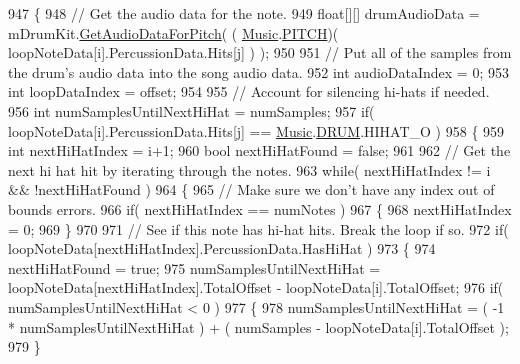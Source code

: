 \begin{DoxyCodeInclude}
947             \{
948                 \textcolor{comment}{// Get the audio data for the note.}
949                 \textcolor{keywordtype}{float}[][] drumAudioData = mDrumKit.\hyperlink{group___v_i_base_pub_func_gaf715f7c3bbd2f1a2fa543b2f0684f8a6}{GetAudioDataForPitch}( (
      \hyperlink{class_music}{Music}.\hyperlink{group___music_enums_ga508f69b199ea518f935486c990edac1d}{PITCH})( loopNoteData[i].PercussionData.Hits[j] ) );
950 
951                 \textcolor{comment}{// Put all of the samples from the drum's audio data into the song audio data.}
952                 \textcolor{keywordtype}{int} audioDataIndex = 0;
953                 \textcolor{keywordtype}{int} loopDataIndex = offset;
954 
955                 \textcolor{comment}{// Account for silencing hi-hats if needed.}
956                 \textcolor{keywordtype}{int} numSamplesUntilNextHiHat = numSamples;
957                 \textcolor{keywordflow}{if}( loopNoteData[i].PercussionData.Hits[j] == \hyperlink{class_music}{Music}.\hyperlink{group___music_enums_gade475b4382c7066d1af13e7c13c029b6}{DRUM}.HIHAT\_O )
958                 \{
959                     \textcolor{keywordtype}{int} nextHiHatIndex = i+1;
960                     \textcolor{keywordtype}{bool} nextHiHatFound = \textcolor{keyword}{false};
961 
962                     \textcolor{comment}{// Get the next hi hat hit by iterating through the notes.}
963                     \textcolor{keywordflow}{while}( nextHiHatIndex != i && !nextHiHatFound )
964                     \{
965                         \textcolor{comment}{// Make sure we don't have any index out of bounds errors.}
966                         \textcolor{keywordflow}{if}( nextHiHatIndex == numNotes )
967                         \{
968                             nextHiHatIndex = 0;
969                         \}
970 
971                         \textcolor{comment}{// See if this note has hi-hat hits. Break the loop if so.}
972                         \textcolor{keywordflow}{if}( loopNoteData[nextHiHatIndex].PercussionData.HasHiHat )
973                         \{
974                             nextHiHatFound = \textcolor{keyword}{true};
975                             numSamplesUntilNextHiHat = loopNoteData[nextHiHatIndex].TotalOffset - 
      loopNoteData[i].TotalOffset;
976                             \textcolor{keywordflow}{if}( numSamplesUntilNextHiHat < 0 )
977                             \{
978                                 numSamplesUntilNextHiHat = ( -1 * numSamplesUntilNextHiHat ) + ( numSamples
       - loopNoteData[i].TotalOffset );
979                             \}

\end{DoxyCodeInclude}
